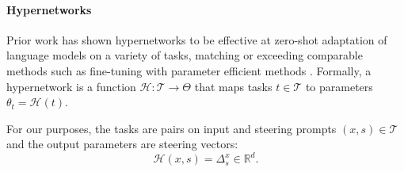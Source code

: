 \documentclass[11pt]{article}
\begin{document}
\paragraph{Hypernetworks}
Prior work has shown hypernetworks to be effective at zero-shot adaptation of language models on a variety of tasks, matching or exceeding comparable methods such as fine-tuning with parameter efficient methods \cite{pmlr-v202-phang23a}.
Formally, a hypernetwork \cite{ha2016hypernetworks} 
is a function $\mathcal{H}: \mathcal{T} \rightarrow \Theta$ that maps tasks $t \in \mathcal{T}$ to parameters $\theta_t = \mathcal{H}(t)$.

For our purposes, the tasks are pairs on input and steering prompts $({x}, {s}) \in \mathcal{T}$ and the output parameters are steering vectors:
\begin{equation}
    \mathcal{H}({x}, {s})= \Delta^x_s \in \mathbb{R}^d.
\end{equation}



\end{document}
